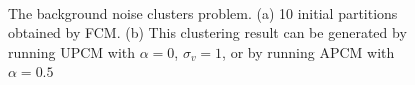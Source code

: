 \documentclass[conference]{IEEEtran}
\theoremstyle{definition}
\begin{document}
\begin{figure}[tb]
\captionsetup[subfloat]{farskip=1pt,captionskip=1pt}%
   \centering
    \\
\caption{The background noise clusters problem. (a) 10 initial partitions obtained by FCM. (b) This clustering result can be generated by running UPCM with $\alpha=0$, $\sigma_v=1$, or by running APCM with $\alpha=0.5$ }
\label{fig_background_noise}
\end{figure}
\end{document}
